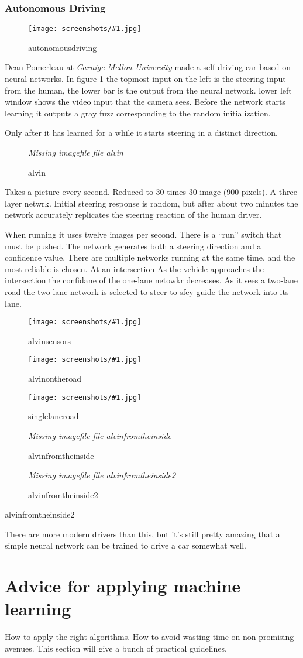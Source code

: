 \documentclass[a4, 12pt, english, USenglish]{scrreprt}
\newcommand{\xscreenshot}[2]{
\begin{figure}[htb]
\begin{center}
\em Missing imagefile file #1
\end{center}
\label{#1}
\caption{#2}
\end{figure}}
\newcommand{\screenshot}[2]{
\begin{figure}[htb]
\texttt{[image: screenshots/\#1.jpg]}
\label{#1}
\caption{#2}
\end{figure}}
\newcommand{\idx}[1]{{\em #1}\index{#1}}
\begin{document}
\subsection{Autonomous Driving}


\screenshot{autonomousdriving}{autonomousdriving}

Dean Pomerleau  at \idx{Carnige Mellon University} made a self-driving
car based on neural networks. In figure \ref{autonomousdriving} the
topmost input on the left is the steering input from the human, the
lower bar is the output from the neural network.  lower left window
shows the video input that the camera sees.  Before the network starts
learning it outputs a gray fuzz corresponding to the random
initialization.

Only after it has learned for a while it starts steering in  a
distinct direction.

\xscreenshot{alvin}{alvin}


Takes a picture every second.  Reduced to 30 times 30 image (900
pixels).  A three layer netwrk.  Initial steering response is random,
but after about two minutes the network accurately replicates the
steering reaction of the human driver.

When running it uses twelve images per second.  There is a ``run''
switch that must be pushed.  The network generates both a steering
direction and a confidence value.   There are multiple networks
running at the same time, and the most reliable is chosen.   At an
intersection   As the vehicle approaches the intersection the
confidane of the one-lane netowkr decreases.   As it sees a two-lane
road the two-lane network is selected to steer to sfey guide the
network into its lane.

\screenshot{alvinsensors}{alvinsensors}
\screenshot{alvinontheroad}{alvinontheroad}
\screenshot{singlelaneroad}{singlelaneroad}

\xscreenshot{alvinfromtheinside}{alvinfromtheinside}
\xscreenshot{alvinfromtheinside2}{alvinfromtheinside2}{alvinfromtheinside2}

There are more modern drivers than this, but it's still pretty amazing
that a simple neural network can be trained to drive a car somewhat well.

\chapter{Advice for applying machine learning}

How to apply the right algorithms. How to avoid wasting time on
non-promising avenues.  This section will give a bunch of practical
guidelines.   
\end{document}
